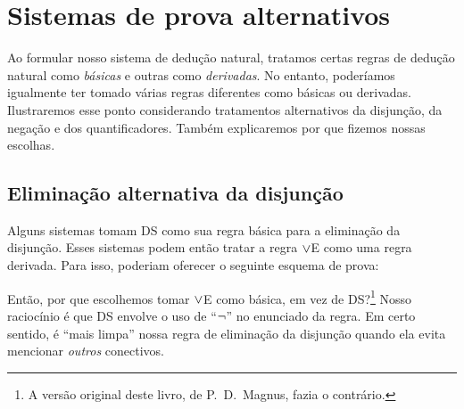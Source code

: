 
\chapter{Sistemas de prova alternativos}
Ao formular nosso sistema de dedução natural, tratamos certas regras de dedução natural como \emph{básicas} e outras como \emph{derivadas}. No entanto, poderíamos igualmente ter tomado várias regras diferentes como básicas ou derivadas. Ilustraremos esse ponto considerando tratamentos alternativos da disjunção, da negação e dos quantificadores. Também explicaremos por que fizemos nossas escolhas.


\section{Eliminação alternativa da disjunção}
Alguns sistemas tomam DS como sua regra básica para a eliminação da disjunção. Esses sistemas podem então tratar a regra $\vee$E como uma regra derivada. Para isso, poderiam oferecer o seguinte esquema de prova:
\begin{fitchproof}
  \open
     \AS
  \close
  \open
     \AS
  \close
  \open
     \AS
    \open
       \AS
    \close
  \close
\end{fitchproof}
Então, por que escolhemos tomar $\vee$E como básica, em vez de DS?\footnote{A versão original deste livro, de P.~D.\ Magnus, fazia o contrário.} Nosso raciocínio é que DS envolve o uso de \textquotedblleft $\neg$\textquotedblright{} no enunciado da regra. Em certo sentido, é \textquotedblleft mais limpa\textquotedblright{} nossa regra de eliminação da disjunção quando ela evita mencionar \emph{outros} conectivos.


